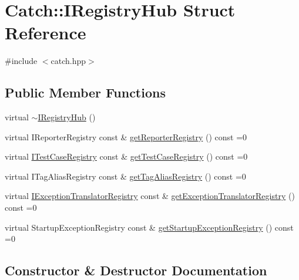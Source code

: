 \hypertarget{struct_catch_1_1_i_registry_hub}{}\section{Catch\+:\+:I\+Registry\+Hub Struct Reference}
\label{struct_catch_1_1_i_registry_hub}


{\ttfamily \#include $<$catch.\+hpp$>$}

\subsection*{Public Member Functions}
\begin{DoxyCompactItemize}
\item 
virtual \mbox{\hyperlink{struct_catch_1_1_i_registry_hub_a050de0f27f96888c8b410992146c9a09}{$\sim$\+I\+Registry\+Hub}} ()
\item 
virtual I\+Reporter\+Registry const  \& \mbox{\hyperlink{struct_catch_1_1_i_registry_hub_a55534563f7ecf7e20ec1e37285ebe54d}{get\+Reporter\+Registry}} () const =0
\item 
virtual \mbox{\hyperlink{struct_catch_1_1_i_test_case_registry}{I\+Test\+Case\+Registry}} const  \& \mbox{\hyperlink{struct_catch_1_1_i_registry_hub_af4f6255f0c0f8f1f179fa9d7d4843076}{get\+Test\+Case\+Registry}} () const =0
\item 
virtual I\+Tag\+Alias\+Registry const  \& \mbox{\hyperlink{struct_catch_1_1_i_registry_hub_a3c511b1d33e5a6d95c333a0ff387df1a}{get\+Tag\+Alias\+Registry}} () const =0
\item 
virtual \mbox{\hyperlink{struct_catch_1_1_i_exception_translator_registry}{I\+Exception\+Translator\+Registry}} const  \& \mbox{\hyperlink{struct_catch_1_1_i_registry_hub_a48347c170d9c583af73027a27b2f0bd4}{get\+Exception\+Translator\+Registry}} () const =0
\item 
virtual Startup\+Exception\+Registry const  \& \mbox{\hyperlink{struct_catch_1_1_i_registry_hub_a00281210628e6c616aca1d3e0d84db04}{get\+Startup\+Exception\+Registry}} () const =0
\end{DoxyCompactItemize}


\subsection{Constructor \& Destructor Documentation}
\mbox{\label{struct_catch_1_1_i_registry_hub_a050de0f27f96888c8b410992146c9a09}} 
